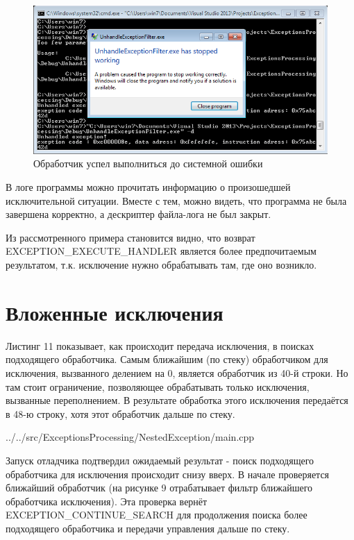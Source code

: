 \documentclass[a4paper, 12pt]{report}		%
\begin{document}
\begin{figure}[h!]
\centering
\includegraphics[scale=0.8]{res/008}
\caption{Обработчик успел выполниться до системной ошибки}
\end{figure}

В логе программы можно прочитать информацию о произошедшей исключительной ситуации. Вместе с тем, можно видеть, что программа не была завершена корректно, а дескриптер файла-лога не был закрыт.



Из рассмотренного примера становится видно, что возврат EXCEPTION\_EXECUTE\_HANDLER является более предпочитаемым результатом, т.к. исключение нужно обрабатывать там, где оно возникло.


\chapter*{Вложенные исключения}

Листинг 11 показывает, как происходит передача исключения, в поисках подходящего обработчика. Самым ближайшим (по стеку) обработчиком для исключения, вызванного делением на 0, является обработчик из 40-й строки. Но там стоит ограничение, позволяющее обрабатывать только исключения, вызванные переполнением. В результате обработка этого исключения передаётся в 48-ю строку, хотя этот обработчик дальше по стеку.


{../../src/ExceptionsProcessing/NestedException/main.cpp}

Запуск отладчика подтвердил ожидаемый результат - поиск подходящего обработчика для исключения происходит снизу вверх. В начале проверяется ближайший обработчик (на рисунке 9 отрабатывает фильтр ближайшего обработчика исключения). Эта проверка вернёт EXCEPTION\_CONTINUE\_SEARCH для продолжения поиска более подходящего обработчика и передачи управления дальше по стеку.
\end{document}
